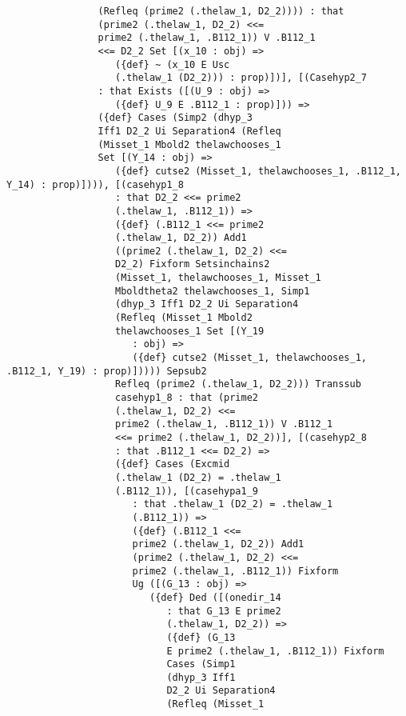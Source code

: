 \documentclass[12pt]{article}
\begin{document}
\begin{verbatim}
                (Refleq (prime2 (.thelaw_1, D2_2)))) : that 
                (prime2 (.thelaw_1, D2_2) <<= 
                prime2 (.thelaw_1, .B112_1)) V .B112_1 
                <<= D2_2 Set [(x_10 : obj) => 
                   ({def} ~ (x_10 E Usc 
                   (.thelaw_1 (D2_2))) : prop)])], [(Casehyp2_7 
                : that Exists ([(U_9 : obj) => 
                   ({def} U_9 E .B112_1 : prop)])) => 
                ({def} Cases (Simp2 (dhyp_3 
                Iff1 D2_2 Ui Separation4 (Refleq 
                (Misset_1 Mbold2 thelawchooses_1 
                Set [(Y_14 : obj) => 
                   ({def} cutse2 (Misset_1, thelawchooses_1, .B112_1, Y_14) : prop)]))), [(casehyp1_8 
                   : that D2_2 <<= prime2 
                   (.thelaw_1, .B112_1)) => 
                   ({def} (.B112_1 <<= prime2 
                   (.thelaw_1, D2_2)) Add1 
                   ((prime2 (.thelaw_1, D2_2) <<= 
                   D2_2) Fixform Setsinchains2 
                   (Misset_1, thelawchooses_1, Misset_1 
                   Mboldtheta2 thelawchooses_1, Simp1 
                   (dhyp_3 Iff1 D2_2 Ui Separation4 
                   (Refleq (Misset_1 Mbold2 
                   thelawchooses_1 Set [(Y_19 
                      : obj) => 
                      ({def} cutse2 (Misset_1, thelawchooses_1, .B112_1, Y_19) : prop)])))) Sepsub2 
                   Refleq (prime2 (.thelaw_1, D2_2))) Transsub 
                   casehyp1_8 : that (prime2 
                   (.thelaw_1, D2_2) <<= 
                   prime2 (.thelaw_1, .B112_1)) V .B112_1 
                   <<= prime2 (.thelaw_1, D2_2))], [(casehyp2_8 
                   : that .B112_1 <<= D2_2) => 
                   ({def} Cases (Excmid 
                   (.thelaw_1 (D2_2) = .thelaw_1 
                   (.B112_1)), [(casehypa1_9 
                      : that .thelaw_1 (D2_2) = .thelaw_1 
                      (.B112_1)) => 
                      ({def} (.B112_1 <<= 
                      prime2 (.thelaw_1, D2_2)) Add1 
                      (prime2 (.thelaw_1, D2_2) <<= 
                      prime2 (.thelaw_1, .B112_1)) Fixform 
                      Ug ([(G_13 : obj) => 
                         ({def} Ded ([(onedir_14 
                            : that G_13 E prime2 
                            (.thelaw_1, D2_2)) => 
                            ({def} (G_13 
                            E prime2 (.thelaw_1, .B112_1)) Fixform 
                            Cases (Simp1 
                            (dhyp_3 Iff1 
                            D2_2 Ui Separation4 
                            (Refleq (Misset_1 

\end{verbatim}
\end{document}
